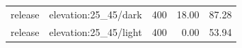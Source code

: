 \begin{longtable}{l>{\raggedright\arraybackslash}p{.42\linewidth}rrr}
release & %
elevation:25\_\allowbreak{}45/dark & %
400 & %
18.00 & %
87.28 \\ %

release & %
elevation:25\_\allowbreak{}45/light & %
400 & %
0.00 & %
53.94 \\ %


\end{longtable}
